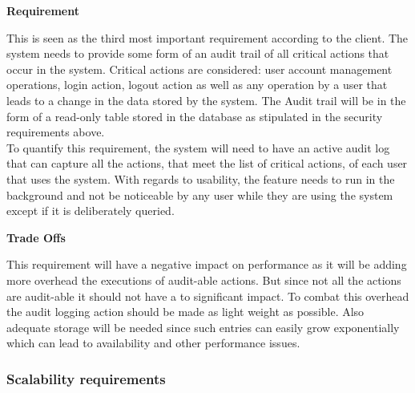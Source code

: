 \begin{flushleft}
\vspace{0.1in}

\textbf{Requirement}

This is seen as the third most important requirement according to the client. The system needs to provide some form of an audit trail of all critical actions that occur in the system. Critical actions are considered: user account management operations, login action, logout action as well as any operation by a user that leads to a change in the data stored by the system. The Audit trail will be in the form of a read-only table stored in the database as stipulated in the security requirements above.\\

To quantify this requirement, the system will need to have an active audit log that can capture all the actions, that meet the list of critical actions, of each user that uses the system. With regards to usability, the feature needs to run in the background and not be noticeable by any user while they are using the system except if it is deliberately queried.
\vspace{0.1in}
%
%

\textbf{Trade Offs}

This requirement will have a negative impact on performance as it will be adding more overhead the executions of audit-able actions. But since not all the actions are audit-able it should not have a to significant impact. To combat this overhead the audit logging action should be made as light weight as possible. Also adequate storage will be needed since such entries can easily grow exponentially which can lead to availability and other performance issues.  

\vspace{0.1in}


\end{flushleft}

\subsubsection{Scalability requirements}

